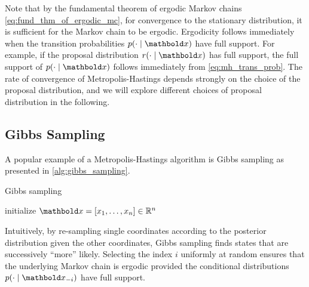Note that by the fundamental theorem of ergodic Markov chains \eqref{eq:fund_thm_of_ergodic_mc}, for convergence to the stationary distribution, it is sufficient for the Markov chain to be ergodic.
Ergodicity follows immediately when the transition probabilities $p(\cdot \mid \vx)$ have full support. For example, if the proposal distribution $r(\cdot \mid \vx)$ has full support, the full support of $p(\cdot \mid \vx)$ follows immediately from \cref{eq:mh_trans_prob}. The rate of convergence of Metropolis-Hastings depends strongly on the choice of the proposal distribution, and we will explore different choices of proposal distribution in the following.

\subsection{Gibbs Sampling}

A popular example of a Metropolis-Hastings algorithm is Gibbs sampling as presented in \cref{alg:gibbs_sampling}.

\begin{algorithm}
  \caption{Gibbs sampling}\label{alg:gibbs_sampling}
  initialize $\vx = [x_1, \dots, x_n] \in \R^n$\;
\end{algorithm}

Intuitively, by re-sampling single coordinates according to the posterior distribution given the other coordinates, Gibbs sampling finds states that are successively ``more'' likely.
Selecting the index $i$ uniformly at random ensures that the underlying Markov chain is ergodic provided the conditional distributions $p(\cdot \mid \vx_{-i})$ have full support.


